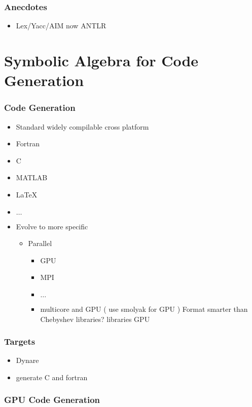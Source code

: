 \documentclass{beamer}
\begin{document}
\begin{frame}
  \frametitle{Anecdotes}
  \begin{itemize}
  \item Lex/Yacc/AIM  now  ANTLR
  \end{itemize}
\end{frame}


\section{Symbolic Algebra for Code Generation}

\begin{frame}
  \frametitle{ Code Generation}
  


\begin{itemize}
\item Standard widely compilable cross platform
\item Fortran
\item C
\item MATLAB
\item \LaTeX
\item $\ldots$
\item Evolve to more specific
  \begin{itemize}
  \item Parallel
    \begin{itemize}
  \item GPU
  \item MPI
  \item $\ldots$
\item multicore and GPU ( use smolyak for GPU ) Format smarter than Chebyshev libraries?  libraries GPU
    \end{itemize}
  \end{itemize}
\end{itemize}

\end{frame}


\begin{frame}
  \frametitle{Targets}
  \begin{itemize}
  \item Dynare
\item generate C and fortran
  \end{itemize}
\end{frame}

\begin{frame}
  \frametitle{GPU Code Generation}
  
\end{frame}
\end{document}
